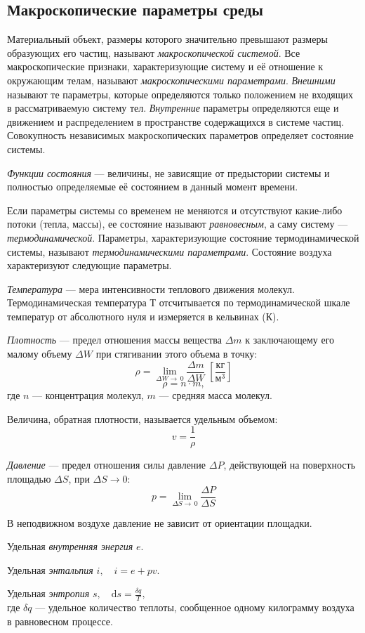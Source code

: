 	\subsection{Макроскопические параметры среды}
	Материальный объект, размеры которого значительно превышают размеры образующих его частиц, называют \textit{макроскопической системой}. Все макроскопические признаки, характеризующие  систему и её отношение к окружающим телам, называют \textit{макроскопическими параметрами}. \textit{Внешними} называют те параметры, которые определяются только положением не входящих в рассматриваемую систему тел. \textit{Внутренние} параметры определяются еще и движением и распределением в пространстве содержащихся в системе частиц. Совокупность независимых макроскопических параметров определяет состояние системы.\par
	\textit{Функции состояния} --- величины, не зависящие от предыстории системы и полностью определяемые её состоянием в данный момент времени.\par
	Если параметры системы со временем не меняются и отсутствуют какие-либо потоки (тепла, массы), ее состояние называют \textit{равновесным}, а саму систему --- \textit{термодинамической}. Параметры, характеризующие состояние термодинамической системы, называют \textit{термодинамическими параметрами}. Состояние воздуха характеризуют следующие параметры.\par
	\textit{Температура} --- мера интенсивности теплового движения молекул. Термодинамическая температура $Т$ отсчитывается по термодинамической шкале температур от абсолютного нуля и измеряется в кельвинах (К).\par
	\textit{Плотность} --- предел отношения массы вещества $\Delta m$ к заключающему его малому объему $\Delta W$ при стягивании этого объема в точку:
	\[ \rho = \lim_{\Delta W \to\,0}\frac{\Delta m}{\Delta W} \; \left[\frac{\text{кг}}{\text{м}^3}\right]\]
	\[ \rho = n\cdot m,\]
	где $n$ --- концентрация молекул, $m$ --- средняя масса молекул.\par
	Величина, обратная плотности, называется удельным объемом:
	\[ v=\frac{1}{\rho} \]\par
	\textit{Давление} --- предел отношения силы давление $\Delta P$, действующей на поверхность площадью $\Delta S$, при $\Delta S \to 0$:
	\[ p = \lim_{\Delta S \to\, 0}\frac{\Delta P}{\Delta S} \]\par
	В неподвижном воздухе давление не зависит от ориентации площадки.\par
	Удельная \textit{внутренняя энергия} $e$.\par
	Удельная \textit{энтальпия} $i,\quad i=e+pv$.\par
	Удельная \textit{энтропия} $s,\quad\mathrm{d}s=\frac{\delta q}{T},$\\
	где $\delta q$ --- удельное количество теплоты, сообщенное одному килограмму воздуха в равновесном процессе.
	
